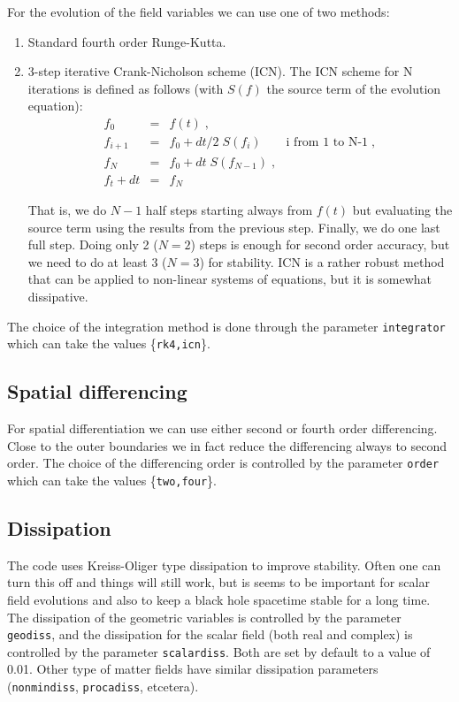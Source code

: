 \documentclass[12pt]{article}
\begin{document}
For the evolution of the field variables we can use one of two
methods:

\begin{enumerate}

\item Standard fourth order Runge-Kutta.

\item 3-step iterative Crank-Nicholson scheme (ICN).  The ICN scheme for
N iterations is defined as follows (with $S(f)$ the source term of the
evolution equation):
\begin{eqnarray}
f_0  &=&  f(t) \; , \\
f_{i+1} &=&  f_0 + dt/2 \; S(f_i)  \qquad \textrm{i from 1 to N-1} \; , \\
f_N &=&  f_0 + dt \; S(f_{N-1}) \; , \\
f_t+dt &=& f_N
\end{eqnarray}

That is, we do $N-1$ half steps starting always from $f(t)$ but
evaluating the source term using the results from the previous step.
Finally, we do one last full step.  Doing only 2 ($N=2$) steps is
enough for second order accuracy, but we need to do at least 3 ($N=3$)
for stability.  ICN is a rather robust method that can be applied to
non-linear systems of equations, but it is somewhat dissipative.

\end{enumerate}

The choice of the integration method is done through the parameter
\texttt{integrator} which can take the values \{\texttt{rk4,icn}\}. \\


\subsection{Spatial differencing}

For spatial differentiation we can use either second or fourth order
differencing.  Close to the outer boundaries we in fact reduce the
differencing always to second order.  The choice of the differencing
order is controlled by the parameter \texttt{order} which can take the
values \{\texttt{two,four}\}. \\


\subsection{Dissipation}

The code uses Kreiss-Oliger type dissipation to improve stability.
Often one can turn this off and things will still work, but is seems
to be important for scalar field evolutions and also to keep a black
hole spacetime stable for a long time. The dissipation of the
geometric variables is controlled by the parameter \texttt{geodiss},
and the dissipation for the scalar field (both real and complex) is
controlled by the parameter \texttt{scalardiss}. Both are set by
default to a value of 0.01. Other type of matter fields have similar
dissipation parameters (\texttt{nonmindiss}, \texttt{procadiss},
etcetera).\\
\end{document}
